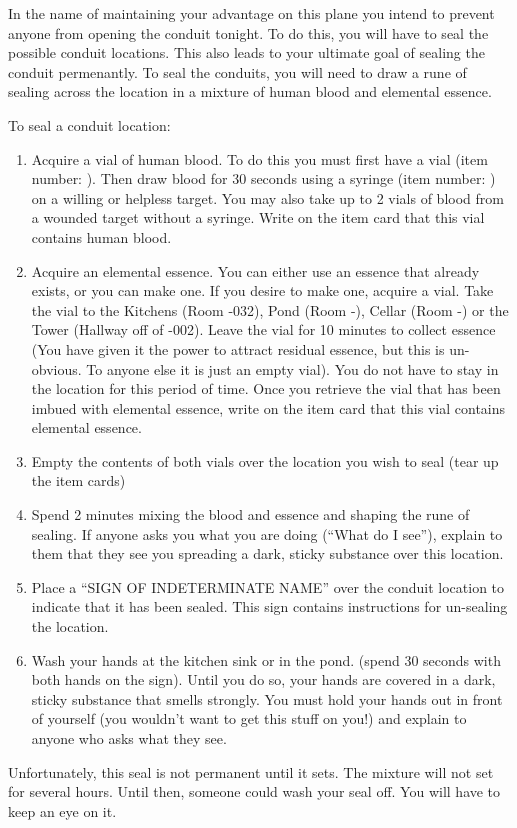 \documentclass[green]{elementals}
\begin{document}
\name{\gSealingLocations{}}

In the name of maintaining your advantage on this plane you intend to prevent anyone from opening the conduit tonight.  To do this, you will have to seal the possible conduit locations. This also leads to your ultimate goal of sealing the conduit permenantly. To seal the conduits, you will need to draw a rune of sealing across the location in a mixture of human blood and elemental essence.

To seal a conduit location:
\begin{enumerate}
  \item Acquire a vial of human blood. To do this you must first have a vial (item number: ). Then draw blood for 30 seconds using a syringe (item number: ) on a willing or helpless target. You may also take up to 2 vials of blood from a wounded target without a syringe. Write on the item card that this vial contains human blood.
  \item Acquire an elemental essence. You can either use an essence that already exists, or you can make one. If you desire to make one, acquire a vial. Take the vial to the Kitchens (Room -032), Pond (Room -), Cellar (Room -) or the Tower (Hallway off of -002). Leave the vial for 10 minutes to collect essence (You have given it the power to attract residual essence, but this is un-obvious. To anyone else it is just an empty vial). You do not have to stay in the location for this period of time. Once you retrieve the vial that has been imbued with elemental essence, write on the item card that this vial contains elemental essence.
  \item Empty the contents of both vials over the location you wish to seal (tear up the item cards)
  \item Spend 2 minutes mixing the blood and essence and shaping the rune of sealing. If anyone asks you what you are doing (``What do I see''), explain to them that they see you spreading a dark, sticky substance over this location.
  \item Place a ``SIGN OF INDETERMINATE NAME'' over the conduit location to indicate that it has been sealed. This sign contains instructions for un-sealing the location.
  \item Wash your hands at the kitchen sink or in the pond. (spend 30 seconds with both hands on the sign). Until you do so, your hands are covered in a dark, sticky substance that smells strongly. You must hold your hands out in front of yourself (you wouldn't want to get this stuff on you!) and explain to anyone who asks what they see.
\end{enumerate}

Unfortunately, this seal is not permanent until it sets. The mixture will not set for several hours. Until then, someone could wash your seal off. You will have to keep an eye on it.
\end{document}
